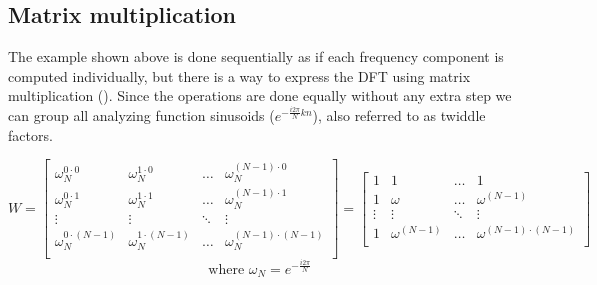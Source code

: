 \documentclass[
  oneside,
  11pt, a4paper,
  footinclude=true,
  headinclude=true,
  cleardoublepage=empty
]{scrbook}
\begin{document}

\subsection{Matrix multiplication} \label{subsec:matrix-multiplication}
The example shown above is done sequentially as if each frequency component is computed individually, but there is a way to express the DFT using matrix multiplication (\cite{rao2018transform}). Since the operations are done equally without any extra step we can group all analyzing function sinusoids (\(e^{- \frac{i 2 \pi}{N} k n}\)), also referred to as twiddle factors.


\begin{equation*}
    W = 
    \begin{bmatrix}
        \omega_{N}^{0 \cdot 0}     & \omega_{N}^{1 \cdot 0}     & \dots  & \omega_{N}^{(N-1) \cdot 0}     \\
        \omega_{N}^{0 \cdot 1}     & \omega_{N}^{1 \cdot 1}     & \dots  & \omega_{N}^{(N-1) \cdot 1}     \\
        \vdots                     & \vdots                     & \ddots & \vdots                          \\
        \omega_{N}^{0 \cdot (N-1)} & \omega_{N}^{1 \cdot (N-1)} & \dots  & \omega_{N}^{(N-1) \cdot (N-1)} \\
    \end{bmatrix} =
    \begin{bmatrix}
        1      & 1              & \dots  & 1                          \\
        1      & \omega         & \dots  & \omega^{(N-1)}             \\
        \vdots & \vdots         & \ddots & \vdots                     \\
        1      & \omega^{(N-1)} & \dots  & \omega^{(N-1) \cdot (N-1)} \\
    \end{bmatrix}
\end{equation*}
\begin{equation*}
    \text{where } \omega_{N} = e^{- \frac{i 2 \pi}{N}}
\end{equation*}
\end{document}
